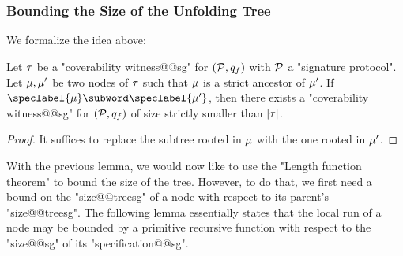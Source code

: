 \subsubsection{Bounding the Size of the Unfolding Tree}
We formalize the idea above:

\begin{lemma}
\label{lem:no_subword_in_branch_sg}
Let $\tau$ be a "coverability witness@@sg" for $(\mathcal{P},q_f)$ with $\mathcal{P}$ a "signature protocol". Let $\mu, \mu'$ be two nodes of $\tau$ such that $\mu$ is a strict ancestor of $\mu'$. If $\speclabel{\node} \subword \speclabel{\node'}$, then there exists a "coverability witness@@sg" for $(\mathcal{P}, q_f)$ of size strictly smaller than $|\tau|$.
\end{lemma}
\begin{proof}
It suffices to replace the subtree rooted in $\mu$ with the one rooted in $\mu'$.
\end{proof}

With the previous lemma, we would now like to use the "Length function theorem" to bound the size of the tree. However, to do that, we first need a bound on the "size@@treesg" of a node with respect to its parent's "size@@treesg". The following lemma essentially states that the local run of a node may be bounded by a primitive recursive function with respect to the "size@@sg" of its "specification@@sg".

